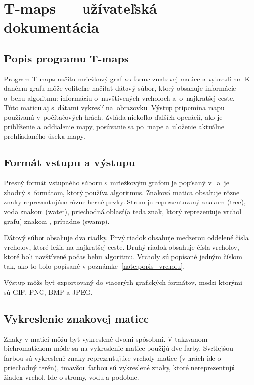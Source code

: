 \chapter{T-maps --- užívateľská dokumentácia}
\label{userdoc}
\section{Popis programu T-maps}
Program T-maps načíta mriežkový graf vo forme znakovej matice a vykreslí ho. K danému grafu môže voliteľne načítať dátový súbor, ktorý obsahuje
informácie o~behu algoritmu: informáciu o~navštívených vrcholoch a~o~najkratšej ceste.
Túto maticu aj s~dátami vykreslí na~obrazovku. Výstup pripomína mapu používanú v~počítačových hrách.
Zvláda niekoľko ďalších operácií, ako je priblíženie a~oddialenie mapy, posúvanie sa po~mape a~uloženie aktuálne prehliadaného úseku mapy.


\section{Formát vstupu a výstupu}
Presný formát vstupného súboru s~mriežkovým grafom je popísaný v~\cite{sturtevant2012benchmarks} a~je zhodný s~formátom, 
ktorý používa algoritmus. Znaková matica obsahuje rôzne znaky reprezentujúce rôzne herné prvky.
Strom je reprezentovaný znakom (tree), voda znakom (water), priechodná oblasť(a teda znak, ktorý reprezentuje
vrchol grafu) znakom , prípadne  (swamp).

Dátový súbor obsahuje dva riadky. Prvý riadok obsahuje medzerou oddelené čísla vrcholov, ktoré ležia na najkratšej ceste.
Druhý riadok obsahuje čísla vrcholov, ktoré boli navštívené počas behu algoritmu. 
Vrcholy sú popísané jedným číslom tak, ako to bolo popísané v poznámke~\ref{note:popis_vrcholu}.

Výstup môže byť exportovaný do viacerých grafických formátov, medzi ktorými sú GIF, PNG, BMP a JPEG.



\section{Vykreslenie znakovej matice}

Znaky v matici môžu byť vykreslené dvomi spôsobmi. V takzvanom bichromatickom móde sa na vykreslenie matice použijú dve farby.
Svetlejšou farbou sú vykreslené znaky reprezentujúce vrcholy matice (v hrách ide o priechodný terén), tmavšou farbou sú vykreslené znaky, ktoré
nereprezentujú žiaden vrchol. Ide o stromy, vodu a podobne.

